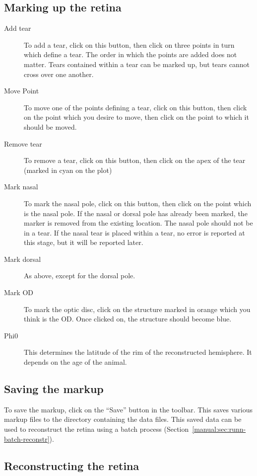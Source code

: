 \documentclass{article}
\begin{document}
\subsection{Marking up the retina}
\label{manual:sec:opening-files-retina}

\begin{description}
\item[Add tear] To add a tear, click on this button, then click on
  three points in turn which define a tear. The order in which the
  points are added does not matter. Tears contained within a tear can
  be marked up, but tears cannot cross over one another.
\item[Move Point] To move one of the points defining a tear, click on
  this button, then click on the point which you desire to move, then
  click on the point to which it should be moved.
\item[Remove tear] To remove a tear, click on this button, then click
  on the apex of the tear (marked in cyan on the plot)
\item[Mark nasal] To mark the nasal pole, click on this button, then
  click on the point which is the nasal pole.  If the nasal or
  dorsal pole has already been marked, the marker is removed from
  the existing location. The nasal pole should not be in a tear. If
  the nasal tear is placed within a tear, no error is reported at this
  stage, but it will be reported later.
\item[Mark dorsal] As above, except for the dorsal pole.
\item[Mark OD] To mark the optic disc, click on the structure marked
  in orange which you think is the OD. Once clicked on, the structure
  should become blue.
\item[Phi0] This determines the latitude of the rim of the
  reconstructed hemisphere. It depends on the age of the animal.
\end{description}

\subsection{Saving the markup}
\label{manual:sec:saving-markup}

To save the markup, click on the ``Save'' button in the toolbar. This
saves various markup files to the directory containing the
data files. This saved data can be used to reconstruct the retina using
a batch process (Section~\ref{manual:sec:runn-batch-reconstr}).

\subsection{Reconstructing the retina}
\label{manual:sec:reconstr-retina}
\end{document}
